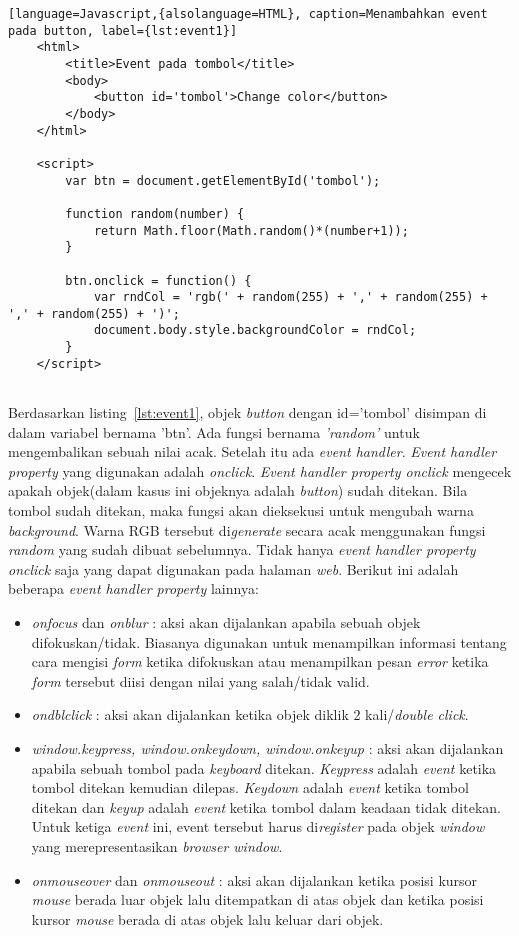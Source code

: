 \begin{lstlisting}[language=Javascript,{alsolanguage=HTML}, caption=Menambahkan event pada button, label={lst:event1}]
	<html>
		<title>Event pada tombol</title>
		<body>
			<button id='tombol'>Change color</button>
		</body>
	</html>
	
	<script>
		var btn = document.getElementById('tombol');

		function random(number) {
  			return Math.floor(Math.random()*(number+1));
		}

		btn.onclick = function() {
  			var rndCol = 'rgb(' + random(255) + ',' + random(255) + ',' + random(255) + ')';
  			document.body.style.backgroundColor = rndCol;
		}
	</script>
	
\end{lstlisting}

Berdasarkan listing~\ref{lst:event1}, objek \textit{button} dengan id='tombol' disimpan di dalam variabel bernama 'btn'. Ada fungsi bernama \textit{'random'} untuk mengembalikan sebuah nilai acak. Setelah itu ada \textit{event handler}. \textit{Event handler property} yang digunakan adalah \textit{onclick}. \textit{Event handler property onclick} mengecek apakah objek(dalam kasus ini objeknya adalah \textit{button}) sudah ditekan. Bila tombol sudah ditekan, maka fungsi akan dieksekusi untuk mengubah warna \textit{background}. Warna RGB tersebut di\textit{generate} secara acak menggunakan fungsi \textit{random} yang sudah dibuat sebelumnya. Tidak hanya \textit{event handler property onclick} saja yang dapat digunakan pada halaman \textit{web}. Berikut ini adalah beberapa \textit{event handler property} lainnya:

\begin{itemize}
	\item \textit{onfocus} dan \textit{onblur} : aksi akan dijalankan apabila sebuah objek difokuskan/tidak. Biasanya digunakan untuk menampilkan informasi tentang cara mengisi \textit{form} ketika difokuskan atau menampilkan pesan \textit{error} ketika \textit{form} tersebut diisi dengan nilai yang salah/tidak valid.
	\item \textit{ondblclick} : aksi akan dijalankan ketika objek diklik 2 kali/\textit{double click}.
	\item \textit{window.keypress, window.onkeydown, window.onkeyup} : aksi akan dijalankan apabila sebuah tombol pada \textit{keyboard} ditekan. \textit{Keypress} adalah \textit{event} ketika tombol ditekan kemudian dilepas. \textit{Keydown} adalah \textit{event} ketika tombol ditekan dan \textit{keyup} adalah \textit{event} ketika tombol dalam keadaan tidak ditekan. Untuk ketiga \textit{event} ini, event tersebut harus di\textit{register} pada objek \textit{window} yang merepresentasikan \textit{browser window}.
	\item \textit{onmouseover} dan \textit{onmouseout} : aksi akan dijalankan ketika posisi kursor \textit{mouse} berada luar objek lalu ditempatkan di atas objek dan ketika posisi kursor \textit{mouse} berada di atas objek lalu keluar dari objek. 
\end{itemize}

